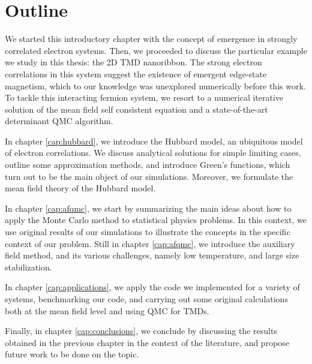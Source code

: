 \section{Outline}
\label{sec:int_outline}

We started this introductory chapter with the concept of emergence in strongly correlated electron systems.
Then, we proceeded to discuss the particular example we study in this thesis: the \acs{2D} \acs{TMD} nanoribbon.
The strong electron correlations in this system suggest the existence of emergent edge-state magnetism, which to our knowledge was unexplored numerically before this work.
To tackle this interacting fermion system, we resort to a numerical iterative solution of the mean field self consistent equation and a state-of-the-art determinant \ac{QMC} algorithm.

In chapter \ref{cap:hubbard}, we introduce the Hubbard model, an ubiquitous model of electron correlations.
We discuss analytical solutions for simple limiting cases, outline some approximation methods, and introduce Green's functions, which turn out to be the main object of our simulations.
Moreover, we formulate the mean field theory of the Hubbard model.

In chapter \ref{cap:afqmc}, we start by summarizing the main ideas about how to apply the Monte Carlo method to statistical physics problems.
In this context, we use original results of our simulations to illustrate the concepts in the specific context of our problem.
Still in chapter \ref{cap:afqmc}, we introduce the auxiliary field method, and its various challenges, namely low temperature, and large size stabilization.

In chapter \ref{cap:applications}, we apply the code we implemented for a variety of systems, benchmarking our code, and carrying out some original calculations both at the mean field level and using \acs{QMC} for \acp{TMD}.

Finally, in chapter \ref{cap:conclusions}, we conclude by discussing the results obtained in the previous chapter in the context of the literature, and propose future work to be done on the topic.
